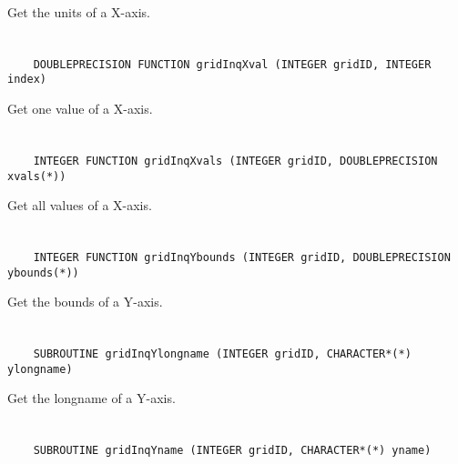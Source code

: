 Get the units of a X-axis.


\section*{\tt {}}

\begin{verbatim}
    DOUBLEPRECISION FUNCTION gridInqXval (INTEGER gridID, INTEGER index)
\end{verbatim}

Get one value of a X-axis.


\section*{\tt {}}

\begin{verbatim}
    INTEGER FUNCTION gridInqXvals (INTEGER gridID, DOUBLEPRECISION xvals(*))
\end{verbatim}

Get all values of a X-axis.


\section*{\tt {}}

\begin{verbatim}
    INTEGER FUNCTION gridInqYbounds (INTEGER gridID, DOUBLEPRECISION ybounds(*))
\end{verbatim}

Get the bounds of a Y-axis.


\section*{\tt {}}

\begin{verbatim}
    SUBROUTINE gridInqYlongname (INTEGER gridID, CHARACTER*(*) ylongname)
\end{verbatim}

Get the longname of a Y-axis.


\section*{\tt {}}

\begin{verbatim}
    SUBROUTINE gridInqYname (INTEGER gridID, CHARACTER*(*) yname)
\end{verbatim}

